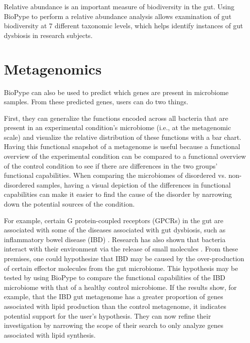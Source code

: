 {Relative abundance is an important measure of biodiversity in the gut. Using BioPype to perform a relative abundance analysis allows examination of gut biodiversity at 7 different taxonomic levels, which helps identify instances of gut dysbiosis in research subjects. 

\section{Metagenomics}

BioPype can also be used to predict which genes are present in microbiome samples. From these predicted genes, users can do two things. 

First, they can generalize the functions encoded across all bacteria that are present in an experimental condition's microbiome (i.e., at the metagenomic scale) and visualize the relative distribution of these functions with a bar chart. Having this functional snapshot of a metagenome is useful because a functional overview of the experimental condition can be compared to a functional overview of the control condition to see if there are differences in the two groups' functional capabilities. When comparing the microbiomes of disordered vs. non-disordered samples, having a visual depiction of the differences in functional capabilities can make it easier to find the cause of the disorder by narrowing down the potential sources of the condition. 

For example, certain G protein-coupled receptors (GPCRs) in the gut are associated with some of the diseases associated with gut dysbiosis, such as inflammatory bowel disease (IBD) \citep{Cohen2017}. Research has also shown that bacteria interact with their environment via the release of small molecules \citep{Li2012}. From these premises, one could hypothesize that IBD may be caused by the over-production of certain effector molecules from the gut microbiome. This hypothesis may be tested by using BioPype to compare the functional capabilities of the IBD microbiome with that of a healthy control microbiome. If the results show, for example, that the IBD gut metagenome has a greater proportion of genes associated with lipid production than the control metagenome, it indicates potential support for the user's hypothesis. They can now refine their investigation by narrowing the scope of their search to only analyze genes associated with lipid synthesis.

}
